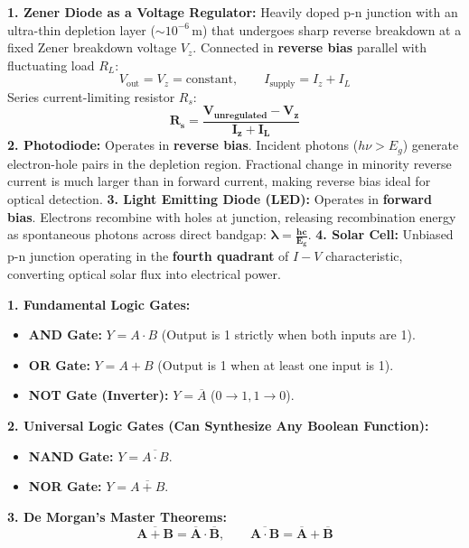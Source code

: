 \documentclass[10pt,twoside,openright]{book}
\begin{document}
\begin{formulabox}
\textbf{1. Zener Diode as a Voltage Regulator:}
Heavily doped p-n junction with an ultra-thin depletion layer ($\sim 10^{-6}\,\mathrm{m}$) that undergoes sharp reverse breakdown at a fixed Zener breakdown voltage $V_z$.
Connected in \textbf{reverse bias} parallel with fluctuating load $R_L$:
\begin{equation}
  V_{\text{out}} = V_z = \text{constant}, \qquad I_{\text{supply}} = I_z + I_L
\end{equation}
Series current-limiting resistor $R_s$:
\begin{equation}
  \mathbf{R_s = \frac{V_{\text{unregulated}} - V_z}{I_z + I_L}}
\end{equation}
\textbf{2. Photodiode:} Operates in \textbf{reverse bias}. Incident photons ($h\nu > E_g$) generate electron-hole pairs in the depletion region. Fractional change in minority reverse current is much larger than in forward current, making reverse bias ideal for optical detection.
\textbf{3. Light Emitting Diode (LED):} Operates in \textbf{forward bias}. Electrons recombine with holes at junction, releasing recombination energy as spontaneous photons across direct bandgap: $\mathbf{\lambda = \frac{hc}{E_g}}$.
\textbf{4. Solar Cell:} Unbiased p-n junction operating in the \textbf{fourth quadrant} of $I-V$ characteristic, converting optical solar flux into electrical power.
\end{formulabox}

\begin{formulabox}
\textbf{1. Fundamental Logic Gates:}
\begin{itemize}
  \item \textbf{AND Gate:} $Y = A \cdot B$ (Output is 1 strictly when both inputs are 1).
  \item \textbf{OR Gate:} $Y = A + B$ (Output is 1 when at least one input is 1).
  \item \textbf{NOT Gate (Inverter):} $Y = \overline{A}$ ($0 \to 1, 1 \to 0$).
\end{itemize}
\textbf{2. Universal Logic Gates (Can Synthesize Any Boolean Function):}
\begin{itemize}
  \item \textbf{NAND Gate:} $Y = \overline{A \cdot B}$.
  \item \textbf{NOR Gate:} $Y = \overline{A + B}$.
\end{itemize}
\textbf{3. De Morgan's Master Theorems:}
\begin{equation}
  \mathbf{\overline{A + B} = \overline{A} \cdot \overline{B}}, \qquad \mathbf{\overline{A \cdot B} = \overline{A} + \overline{B}}
\end{equation}
\end{formulabox}
\end{document}

